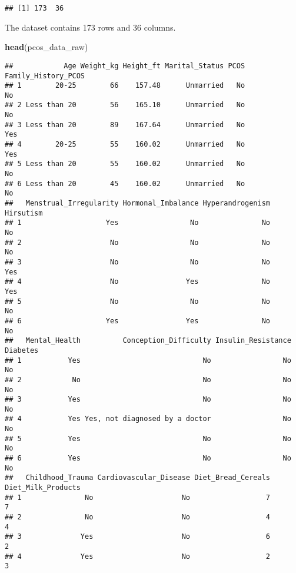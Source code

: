 \documentclass[
]{article}
\newenvironment{Shaded}{\begin{snugshade}}{\end{snugshade}}
\newcommand{\FunctionTok}[1]{\textcolor[rgb]{0.13,0.29,0.53}{\textbf{#1}}}
\newcommand{\NormalTok}[1]{#1}
\begin{document}
\begin{verbatim}
## [1] 173  36
\end{verbatim}

The dataset contains 173 rows and 36 columns.

\begin{Shaded}
\begin{Highlighting}[]
\FunctionTok{head}\NormalTok{(pcos\_data\_raw)}
\end{Highlighting}
\end{Shaded}

\begin{verbatim}
##            Age Weight_kg Height_ft Marital_Status PCOS Family_History_PCOS
## 1        20-25        66    157.48      Unmarried   No                  No
## 2 Less than 20        56    165.10      Unmarried   No                  No
## 3 Less than 20        89    167.64      Unmarried   No                 Yes
## 4        20-25        55    160.02      Unmarried   No                 Yes
## 5 Less than 20        55    160.02      Unmarried   No                  No
## 6 Less than 20        45    160.02      Unmarried   No                  No
##   Menstrual_Irregularity Hormonal_Imbalance Hyperandrogenism Hirsutism
## 1                    Yes                 No               No        No
## 2                     No                 No               No        No
## 3                     No                 No               No       Yes
## 4                     No                Yes               No       Yes
## 5                     No                 No               No        No
## 6                    Yes                Yes               No        No
##   Mental_Health          Conception_Difficulty Insulin_Resistance Diabetes
## 1           Yes                             No                 No       No
## 2            No                             No                 No       No
## 3           Yes                             No                 No       No
## 4           Yes Yes, not diagnosed by a doctor                 No       No
## 5           Yes                             No                 No       No
## 6           Yes                             No                 No       No
##   Childhood_Trauma Cardiovascular_Disease Diet_Bread_Cereals Diet_Milk_Products
## 1               No                     No                  7                  7
## 2               No                     No                  4                  4
## 3              Yes                     No                  6                  2
## 4              Yes                     No                  2                  3

\end{verbatim}
\end{document}
